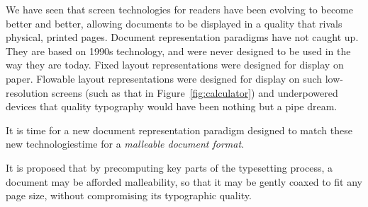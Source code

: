 We have seen that screen technologies for \ebook{} readers have been evolving to become better and better, allowing documents to be displayed in a quality that rivals physical, printed pages. Document representation paradigms have not caught up. They are based on 1990s technology, and were never designed to be used in the way they are today. Fixed layout representations were designed for display on paper. Flowable layout representations were designed for display on such low-resolution screens (such as that in Figure~\ref{fig:calculator}) and underpowered devices that quality typography would have been nothing but a pipe dream.

It is time for a new document representation paradigm designed to match these new technologies\ed time for a \emph{malleable document format}.

It is proposed that by precomputing key parts of the typesetting process, a document may be afforded malleability, so that it may be gently coaxed to fit any page size, without compromising its typographic quality.

